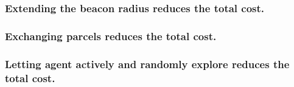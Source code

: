 \documentclass[../main.tex]{subfiles}
\begin{document}
\subsubsection{Extending the beacon radius reduces the total cost.}

\subsubsection{Exchanging parcels reduces the total cost.}
\subsubsection{Letting agent actively and randomly explore reduces the total cost.}
\end{document}
